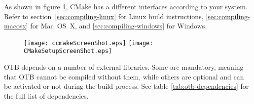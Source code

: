 As shown in figure \ref{fig:CMakeGUI}, CMake has a different interfaces according to your system.
Refer to section~\ref{sec:compiling-linux} for Linux build instructions, 
\ref{sec:compiling-macosx} for Mac~OS~X,
and \ref{sec:compiling-windows} for Windows.

\begin{figure}[tpb]
\centering
\texttt{[image: ccmakeScreenShot.eps]}
\texttt{[image: CMakeSetupScreenShot.eps]}
\label{fig:CMakeGUI}
\end{figure}

OTB depends on a number of external libraries.
Some are mandatory, meaning that OTB cannot be compiled without them, while others are optional and can be activated or
not during the build process.
See table \ref{tab:otb-dependencies} for the full list of dependencies.
